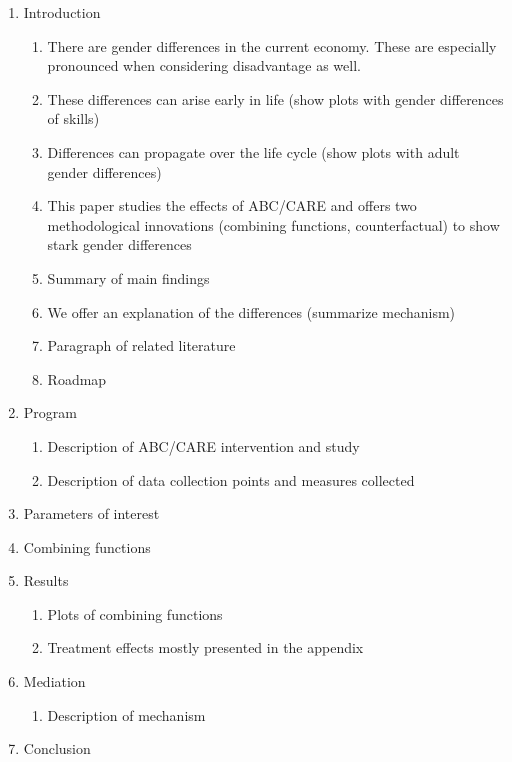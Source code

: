 \begin{enumerate}
\item	Introduction
	\begin{enumerate}
		\item There are gender differences in the current economy. These are especially pronounced when considering disadvantage as well.
		\item These differences can arise early in life (show plots with gender differences of skills)
		\item Differences can propagate over the life cycle (show plots with adult gender differences)
		\item This paper studies the effects of ABC/CARE and offers two methodological innovations (combining functions, counterfactual) to show stark gender differences
		\item Summary of main findings
		\item We offer an explanation of the differences (summarize mechanism)
		\item Paragraph of related literature
		\item Roadmap
	\end{enumerate}
\item Program
	\begin{enumerate}
		\item Description of ABC/CARE intervention and study
		\item Description of data collection points and measures collected
	\end{enumerate}
\item Parameters of interest
\item Combining functions
\item Results
	\begin{enumerate}
		\item Plots of combining functions
		\item Treatment effects mostly presented in the appendix
	\end{enumerate}
\item Mediation
	\begin{enumerate}
		\item Description of mechanism
	\end{enumerate}
\item Conclusion
\end{enumerate}


\tableofcontents

\doublespacing

